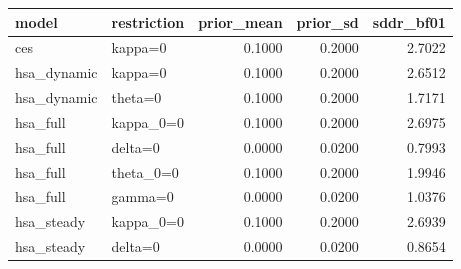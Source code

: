 \begin{tabular}{llrrr}
\toprule
model & restriction & prior\_mean & prior\_sd & sddr\_bf01 \\
\midrule
ces & kappa=0 & 0.1000 & 0.2000 & 2.7022 \\
hsa\_dynamic & kappa=0 & 0.1000 & 0.2000 & 2.6512 \\
hsa\_dynamic & theta=0 & 0.1000 & 0.2000 & 1.7171 \\
hsa\_full & kappa\_0=0 & 0.1000 & 0.2000 & 2.6975 \\
hsa\_full & delta=0 & 0.0000 & 0.0200 & 0.7993 \\
hsa\_full & theta\_0=0 & 0.1000 & 0.2000 & 1.9946 \\
hsa\_full & gamma=0 & 0.0000 & 0.0200 & 1.0376 \\
hsa\_steady & kappa\_0=0 & 0.1000 & 0.2000 & 2.6939 \\
hsa\_steady & delta=0 & 0.0000 & 0.0200 & 0.8654 \\
\bottomrule
\end{tabular}
